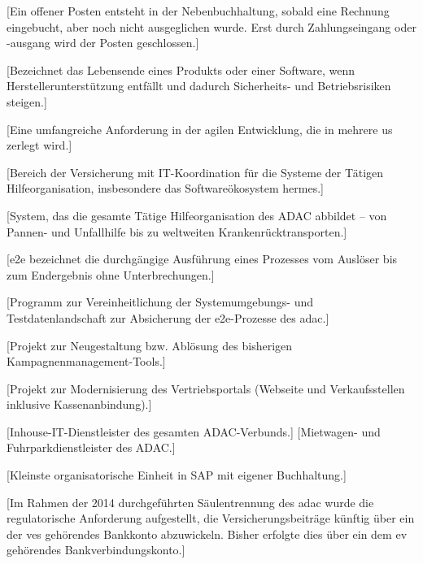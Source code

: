 [Ein offener Posten entsteht in der Nebenbuchhaltung, sobald eine Rechnung eingebucht, aber noch nicht ausgeglichen wurde. Erst durch Zahlungseingang oder -ausgang wird der Posten geschlossen.]

[Bezeichnet das Lebensende eines Produkts oder einer Software, wenn Herstellerunterstützung entfällt und dadurch Sicherheits- und Betriebsrisiken steigen.]

[Eine umfangreiche Anforderung in der agilen Entwicklung, die in mehrere \gls{us} zerlegt wird.]

[Bereich der Versicherung mit IT-Koordination für die Systeme der Tätigen Hilfeorganisation, insbesondere das Softwareökosystem \gls{hermes}.]

[System, das die gesamte Tätige Hilfeorganisation des ADAC abbildet – von Pannen- und Unfallhilfe bis zu weltweiten Krankenrücktransporten.]

[\gls{e2e} bezeichnet die durchgängige Ausführung eines Prozesses vom Auslöser bis zum Endergebnis ohne Unterbrechungen.]

[Programm zur Vereinheitlichung der Systemumgebungs- und Testdatenlandschaft zur Absicherung der \gls{e2e}-Prozesse des \gls{adac}.]

[Projekt zur Neugestaltung bzw. Ablösung des bisherigen Kampagnenmanagement-Tools.]

[Projekt zur Modernisierung des Vertriebsportals (Webseite und Verkaufsstellen inklusive Kassenanbindung).]

[Inhouse-IT-Dienstleister des gesamten ADAC-Verbunds.]
[Mietwagen- und Fuhrparkdienstleister des ADAC.]

[Kleinste organisatorische Einheit in SAP mit eigener Buchhaltung.]

[Im Rahmen der 2014 durchgeführten Säulentrennung des \gls{adac} wurde die regulatorische Anforderung aufgestellt, die Versicherungsbeiträge künftig über ein der \gls{ves} gehörendes Bankkonto abzuwickeln. Bisher erfolgte dies über ein dem \gls{ev} gehörendes Bankverbindungskonto.]

